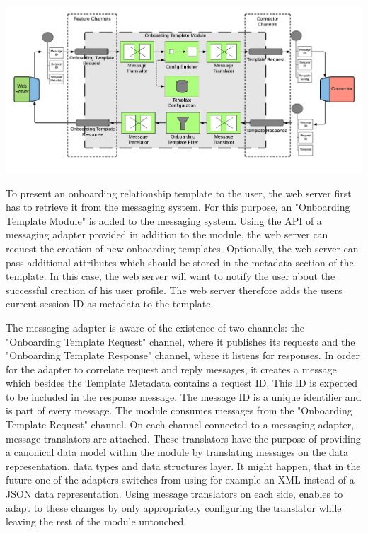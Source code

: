 \begin{center}
    \includegraphics[scale=0.6]{Diagrams/Integration Architecture 1/Technological Integration/6. Onboarding Template Module.pdf}
\end{center}

To present an onboarding relationship template to the user, the web server first has to retrieve it from the messaging system. For this purpose, an "Onboarding Template Module" is added to the messaging system. Using the API of a messaging adapter provided in addition to the module, the web server can request the creation of new onboarding templates. Optionally, the web server can pass additional attributes which should be stored in the metadata section of the template. In this case, the web server will want to notify the user about the successful creation of his user profile. The web server therefore adds the users current session ID as metadata to the template.

The messaging adapter is aware of the existence of two channels: the "Onboarding Template Request" channel, where it publishes its requests and the "Onboarding Template Response" channel, where it listens for responses. In order for the adapter to correlate request and reply messages, it creates a message which besides the Template Metadata contains a request ID. This ID is expected to be included in the response message. The message ID is a unique identifier and is part of every message. The module consumes messages from the "Onboarding Template Request" channel. On each channel connected to a messaging adapter, message translators are attached. These translators have the purpose of providing a canonical data model within the module by translating messages on the data representation, data types and data structures layer. It might happen, that in the future one of the adapters switches from using for example an XML instead of a JSON data representation. Using message translators on each side, enables to adapt to these changes by only appropriately configuring the translator while leaving the rest of the module untouched.

